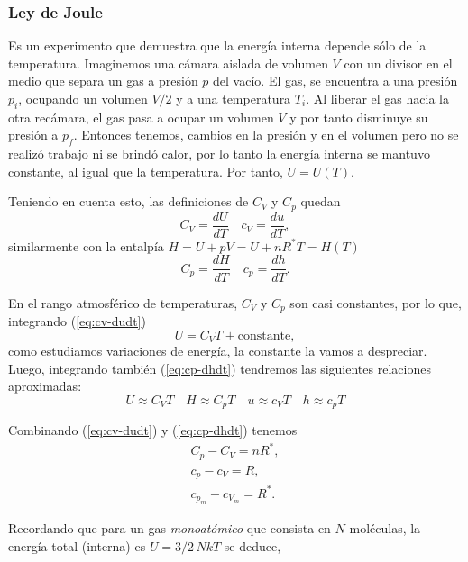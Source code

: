 \documentclass[openany]{book}
\begin{document}
\subsubsection{Ley de Joule}
Es un experimento que demuestra que la energía interna depende sólo de la temperatura. Imaginemos una cámara aislada de volumen $V$ con un divisor en el medio que separa un gas a presión $p$ del vacío. El gas, se encuentra a una presión $p_i$, ocupando un volumen $V/2$ y a una temperatura $T_i$. Al liberar el gas hacia la otra recámara, el gas pasa a ocupar un volumen $V$ y por tanto disminuye su presión a $p_f$. Entonces tenemos, cambios en la presión y en el volumen pero no se realizó trabajo ni se brindó calor, por lo tanto la energía interna se mantuvo constante, al igual que la temperatura. Por tanto, $U=U(T)$.\vspace{2mm}
\par Teniendo en cuenta esto, las definiciones de $C_V$ y $C_p$ quedan
\begin{equation}\label{eq:cv-dudt}
	C_V=\frac{dU}{dT}\quad c_V=\frac{du}{dT},
\end{equation}
similarmente con la entalpía $H=U+pV=U+nR^*T=H(T)$
\begin{equation}\label{eq:cp-dhdt}
	C_p=\frac{dH}{dT}\quad c_p=\frac{dh}{dT}.
\end{equation}
\par En el rango atmosférico de temperaturas, $C_V$ y $C_p$ son casi constantes, por lo que, integrando (\ref{eq:cv-dudt})
\begin{equation*}
	U=C_VT+\mathrm{constante},
\end{equation*}
como estudiamos variaciones de energía, la constante la vamos a despreciar. Luego, integrando también (\ref{eq:cp-dhdt}) tendremos las siguientes relaciones aproximadas:
\begin{equation*}
	U\approx C_VT\quad H\approx C_pT\quad u\approx c_VT\quad h\approx c_pT
\end{equation*}
\par Combinando (\ref{eq:cv-dudt}) y (\ref{eq:cp-dhdt}) tenemos
\begin{gather}
	\label{eq_cvcpnR}
	C_p-C_V=nR^*,\\
	\label{eq:cvcpR}
	c_p-c_V=R,\\
	\label{eq:cvmcpmR*}
	c_{p_m}-c_{V_m}=R^*.
\end{gather}
\par Recordando que para un gas \emph{monoatómico} que consista en $N$ moléculas, la energía total (interna) es $U=3/2\,NkT$ se deduce,
\end{document}
